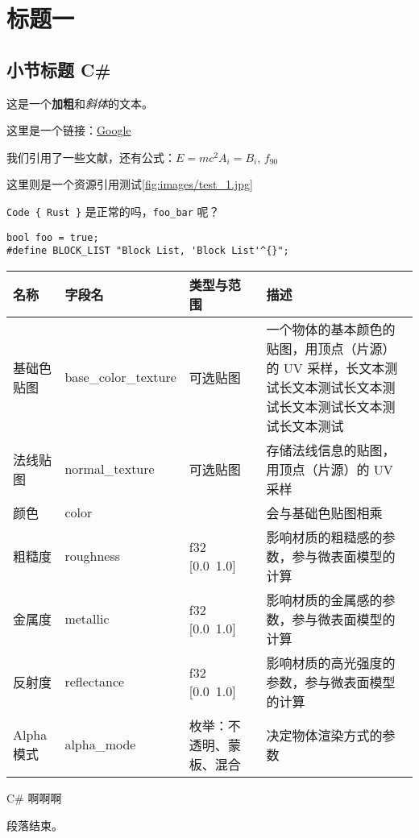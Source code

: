 \chapter*{标题一}

\section{小节标题 C\#}

这是一个\textbf{加粗}和\textit{斜体}的文本。

这里是一个链接：\href{https://www.google.com}{Google}

我们引用了一些文献\cite{foo}，还有公式：$E = mc^2 A_i = B_i$, $f_{90}$

这里则是一个资源引用测试\ref{fig:images/test_1.jpg}

\texttt{Code \{ Rust \}} 是正常的吗，\texttt{foo\_bar} 呢？

\begin{lstlisting}
bool foo = true;
#define BLOCK_LIST "Block List, 'Block List'^{}";
\end{lstlisting}


\begin{tabularx}{\textwidth}{|>{\centering\arraybackslash}X|>{\centering\arraybackslash}X|>{\centering\arraybackslash}X|>{\centering\arraybackslash}X|} \hline
名称 & 字段名 & 类型与范围 & 描述 \\ \hline
基础色贴图 & base\_color\_texture & 可选贴图 & 一个物体的基本颜色的贴图，用顶点（片源）的 UV 采样，长文本测试长文本测试长文本测试长文本测试长文本测试长文本测试 \\ \hline
法线贴图 & normal\_texture & 可选贴图 & 存储法线信息的贴图，用顶点（片源）的 UV 采样 \\ \hline
颜色 & color & [f32; 4] & 会与基础色贴图相乘 \\ \hline
粗糙度 & roughness & f32 [0.0~1.0] & 影响材质的粗糙感的参数，参与微表面模型的计算 \\ \hline
金属度 & metallic & f32 [0.0~1.0] & 影响材质的金属感的参数，参与微表面模型的计算 \\ \hline
反射度 & reflectance & f32 [0.0~1.0] & 影响材质的高光强度的参数，参与微表面模型的计算 \\ \hline
Alpha 模式 & alpha\_mode & 枚举：不透明、蒙板、混合 & 决定物体渲染方式的参数 \\ \hline
\end{tabularx}

C\# 啊啊啊

段落结束。

